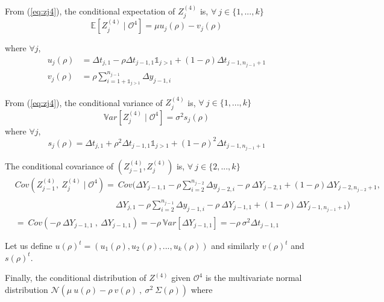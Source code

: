 \noindent From (\ref{eq:zj4}), the conditional expectation of $Z_j^{(4)}$ is, $\forall\ j \in \{1,...,k\} $
\begin{equation}
\mathbb{E}\left[Z_j^{(4)} \mid \mathcal{O}^4\right] = \mu u_j(\rho) - v_j(\rho)
\label{eq:espzj4}
\end{equation}

\noindent where $\forall j$,
\begin{align*}
u_j(\rho) &= \Delta t_{j,1}-\rho \Delta t_{j-1,1} \mathds{1}_{j>1}+(1-\rho)\Delta t_{j-1,n_{j-1}+1}\\
v_j(\rho) &= \rho \sum\limits_{i=1+\mathds{1}_{j>1}}^{n_{j-1}} \Delta y_{j-1,i}
\end{align*}

\noindent From (\ref{eq:zj4}), the conditional variance of $Z_j^{(4)}$ is, $\forall\ j \in \{1,...,k\}$
\begin{equation}
\mathbb{V}ar\left[Z_j^{(4)} \mid \mathcal{O}^4\right]= \sigma^2 s_j(\rho)
\label{eq:varzj4}
\end{equation}
\noindent where $\forall j$,
$$s_j(\rho) = \Delta t_{j,1}+\rho^2 \Delta t_{j-1,1} \mathds{1}_{j>1}+(1-\rho)^2 \Delta t_{j-1,n_{j-1}+1}$$

\noindent The conditional covariance of $(Z_{j-1}^{(4)},Z_j^{(4)})$ is, $\forall\ j \in \{2,...,k\}$
\begin{align}
&Cov\left(Z_{j-1}^{(4)},\ Z_j^{(4)} \mid \mathcal{O}^4  \right)
= \ Cov (\Delta Y_{j-1,1}-\rho \sum\limits_{i=2}^{n_{j-2}} \Delta y_{j-2,i}-\rho\ \Delta Y_{j-2,1} +(1-\rho)\Delta Y_{j-2,n_{j-2}+1},\nonumber\\
& \phantom{Cov\left(Z_{j-1}^4,\ Z_j^{(4)} \mid \mathcal{O}^4  \right)
=}\Delta Y_{j,1} -\rho \sum\limits_{i=2}^{n_{j-1}} \Delta  y_{j-1,i}-\rho\ \Delta Y_{j-1,1} 
+(1-\rho)\Delta Y_{j-1,n_{j-1}+1} ) \nonumber\\
&= \ Cov(-\rho\ \Delta Y_{j-1,1}\ ,\ \Delta Y_{j-1,1}) =-\rho\ \mathbb{V}ar [ \Delta Y_{j-1,1}] 
= -\rho\ \sigma^2 \Delta t_{j-1,1}
\end{align}

\noindent Let us define 
$u(\rho)^t = (u_1(\rho),u_2(\rho),...,u_{k}(\rho)) $ and similarly $v(\rho)^t$ and $s(\rho)^t$.

\noindent Finally, the conditional distribution of $Z^{(4)}$ given $\mathcal{O}^4$ is the multivariate normal distribution $\mathcal{N}(\mu\ u(\rho) -\rho\ v(\rho)\ , \ \sigma^2\ \Sigma(\rho))$ 
where
\\

